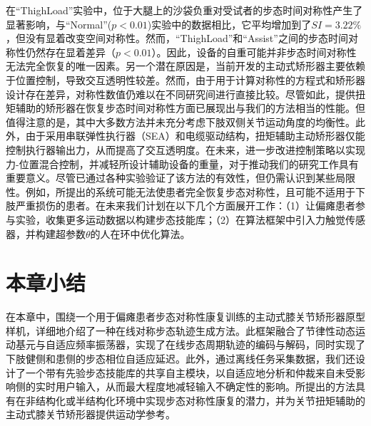 在``ThighLoad''实验中，位于大腿上的沙袋负重对受试者的步态时间对称性产生了显著影响，与``Normal''($p<0.01$)实验中的数据相比，它平均增加到了${SI}=3.22 \%$，但没有显着改变空间对称性。然而，``ThighLoad''和``Assist''之间的步态时间对称性仍然存在显着差异（$p<0.01$）。因此，设备的自重可能并非步态时间对称性无法完全恢复的唯一因素。另一个潜在原因是，当前开发的主动式矫形器主要依赖于位置控制，导致交互透明性较差。然而，由于用于计算对称性的方程式和矫形器设计存在差异，对称性数值仍难以在不同研究间进行直接比较。尽管如此，提供扭矩辅助的矫形器在恢复步态时间对称性方面已展现出与我们的方法相当的性能。但值得注意的是，其中大多数方法并未充分考虑下肢双侧关节运动角度的均衡性。此外，由于采用串联弹性执行器（SEA）和电缆驱动结构，扭矩辅助主动矫形器仅能控制执行器输出力，从而提高了交互透明度。在未来，进一步改进控制策略以实现力-位置混合控制，并减轻所设计辅助设备的重量，对于推动我们的研究工作具有重要意义。尽管已通过各种实验验证了该方法的有效性，但仍需认识到某些局限性。例如，所提出的系统可能无法使患者完全恢复步态对称性，且可能不适用于下肢严重损伤的患者。在未来我们计划在以下几个方面展开工作：（1）让偏瘫患者参与实验，收集更多运动数据以构建步态技能库；（2）在算法框架中引入力触觉传感器，并构建超参数$\theta$的人在环中优化算法。

\section{本章小结}
在本章中，围绕一个用于偏瘫患者步态对称性康复训练的主动式膝关节矫形器原型样机，详细地介绍了一种在线对称步态轨迹生成方法。此框架融合了节律性动态运动基元与自适应频率振荡器，实现了在线步态周期轨迹的编码与解码，同时实现了下肢健侧和患侧的步态相位自适应延迟。此外，通过离线任务采集数据，我们还设计了一个带有先验步态技能库的共享自主模块，以自适应地分析和仲裁来自未受影响侧的实时用户输入，从而最大程度地减轻输入不确定性的影响。所提出的方法具有在非结构化或半结构化环境中实现步态对称性康复的潜力，并为关节扭矩辅助的主动式膝关节矫形器提供运动学参考。